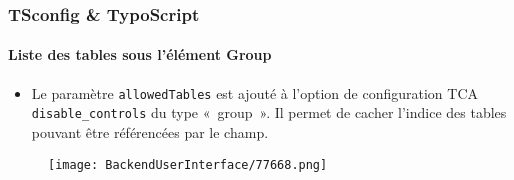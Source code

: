 \begin{frame}[fragile]
	\frametitle{TSconfig \& TypoScript}
	\framesubtitle{Liste des tables sous l'élément Group}

	\begin{itemize}

		\item Le paramètre \texttt{allowedTables} est ajouté à l'option de
			configuration TCA \texttt{disable\_controls} du type «~group~».
			Il permet de cacher l'indice des tables pouvant être
			référencées par le champ.

	\end{itemize}

	\begin{figure}
		\texttt{[image: BackendUserInterface/77668.png]}
	\end{figure}

\end{frame}

